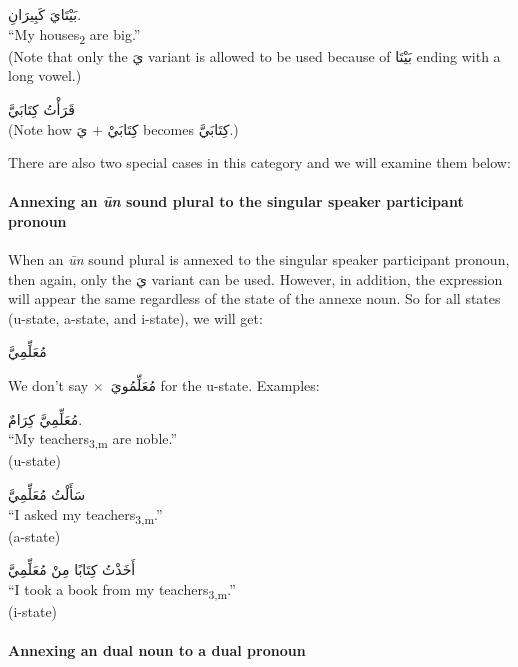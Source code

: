\documentclass[
  10pt,
]{book}
\begin{document}
\foreignlanguage{arabic}{بَيْتَايَ کَبِيرَانِ.}\\
\enquote{My houses\textsubscript{2} are big.}\\
(Note that only the \foreignlanguage{arabic}{يَ} variant is allowed to be used because of \foreignlanguage{arabic}{بَيْتَا} ending with a long vowel.)

\foreignlanguage{arabic}{قَرَأْتُ کِتَابَيَّ}\\
(Note how \foreignlanguage{arabic}{کِتَابَيْ + يَ} becomes \foreignlanguage{arabic}{کِتَابَيَّ}.)

There are also two special cases in this category and we will examine them below:

\paragraph*{\texorpdfstring{Annexing an \emph{ūn} sound plural to the singular speaker participant pronoun}{Annexing an ūn sound plural to the singular speaker participant pronoun}}\label{annexing-an-un-sound-plural-to-the-singular-speaker-participant-pronoun}

When an \emph{ūn} sound plural is annexed to the singular speaker participant pronoun, then again, only the \foreignlanguage{arabic}{يَ} variant can be used. However, in addition, the expression will appear the same regardless of the state of the annexe noun. So for all states (u-state, a-state, and i-state), we will get:

\foreignlanguage{arabic}{مُعَلِّمِيَّ}

We don't say \(\times\)~\foreignlanguage{arabic}{مُعَلِّمُويَ} for the u-state. Examples:

\foreignlanguage{arabic}{مُعَلِّمِيَّ کِرَامٌ.}\\
\enquote{My teachers\textsubscript{3,m} are noble.}\\
(u-state)

\foreignlanguage{arabic}{سَأَلْتُ مُعَلِّمِيَّ}\\
\enquote{I asked my teachers\textsubscript{3,m}.}\\
(a-state)

\foreignlanguage{arabic}{أَخَذْتُ کِتَابًا مِنْ مُعَلِّمِيَّ}\\
\enquote{I took a book from my teachers\textsubscript{3,m}.}\\
(i-state)

\paragraph*{Annexing an dual noun to a dual pronoun}\label{annexing-an-dual-noun-to-a-dual-pronoun}
\end{document}
